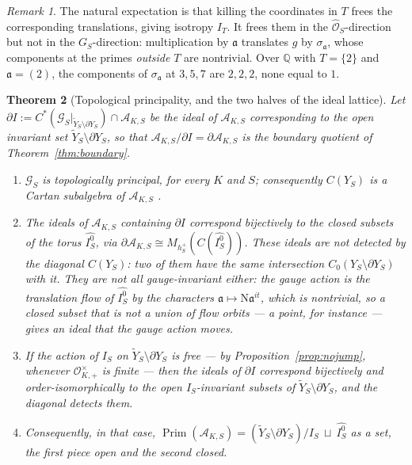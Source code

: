\documentclass[11pt]{amsart}
\numberwithin{equation}{section}
\newtheorem{theorem}{Theorem}[section]
\theoremstyle{definition}
\theoremstyle{remark}
\newtheorem{remark}[theorem]{Remark}
\newcommand{\Q}{\mathbb{Q}}
\newcommand{\cA}{\mathcal{A}}
\newcommand{\cG}{\mathcal{G}}
\newcommand{\cO}{\mathcal{O}}
\newcommand{\hO}{\widehat{\cO}}
\newcommand{\aaa}{\mathfrak{a}}
\newcommand{\Ns}{\mathrm{N}}
\begin{document}
\begin{remark}\label{rem:whynojump}
The natural expectation is that killing the coordinates in $T$ frees the corresponding
translations, giving isotropy $I_T$. It frees them in the $\hO_S$-direction but not in the
$G_S$-direction: multiplication by $\aaa$ translates $g$ by $\sigma_\aaa$, whose components
at the primes \emph{outside} $T$ are nontrivial. Over $\Q$ with $T=\{2\}$ and $\aaa=(2)$,
the components of $\sigma_\aaa$ at $3,5,7$ are $2,2,2$, none equal to $1$.
\end{remark}

\begin{theorem}[Topological principality, and the two halves of the ideal lattice]\label{thm:principal}
Let $\partial I:=C^*(\cG_S|_{\widetilde Y_S\setminus\partial Y_S})\cap\cA_{K,S}$ be the ideal of
$\cA_{K,S}$ corresponding to the open invariant set $\widetilde Y_S\setminus\partial Y_S$, so
that $\cA_{K,S}/\partial I=\partial\cA_{K,S}$ is the boundary quotient of
Theorem~\ref{thm:boundary}.
\begin{enumerate}
\item $\cG_S$ is topologically principal, for every $K$ and $S$; consequently $C(Y_S)$ is a
Cartan subalgebra of $\cA_{K,S}$ \cite{Renault08}.
\item The ideals of $\cA_{K,S}$ containing $\partial I$ correspond bijectively to the closed
subsets of the torus $\widehat{I_S^0}$, via
$\partial\cA_{K,S}\cong M_{h^+_S}(C(\widehat{I_S^0}))$. These ideals are not detected by the
diagonal $C(Y_S)$: two of them have the same intersection $C_0(Y_S\setminus\partial Y_S)$
with it. They are not all gauge-invariant either: the gauge action is the translation flow
of $\widehat{I_S^0}$ by the characters $\aaa\mapsto\Ns\aaa^{it}$, which is nontrivial, so
a closed subset that is not a union of flow orbits --- a point, for instance --- gives an
ideal that the gauge action moves.
\item If the action of $I_S$ on $\widetilde Y_S\setminus\partial Y_S$ is free --- by
Proposition~\ref{prop:nojump}, whenever $\cO^\times_{K,+}$ is finite --- then the ideals of
$\partial I$ correspond bijectively and order-isomorphically to the open $I_S$-invariant
subsets of $\widetilde Y_S\setminus\partial Y_S$, and the diagonal detects them.
\item Consequently, in that case,
$\operatorname{Prim}(\cA_{K,S})=(\widetilde Y_S\setminus\partial Y_S)/I_S\ \sqcup\ \widehat{I_S^0}$
as a set, the first piece open and the second closed.
\end{enumerate}
\end{theorem}
\end{document}
